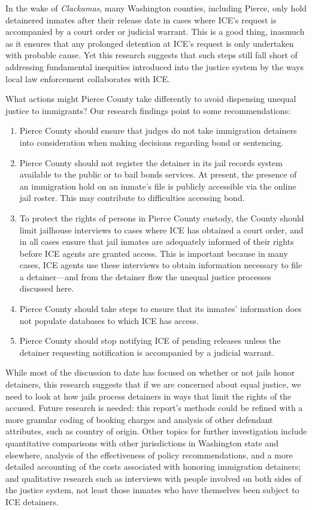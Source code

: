 \documentclass[12pt]{report}\usepackage[]{graphicx}\usepackage[]{color}
\begin{document}
In the wake of \emph{Clackamas}, many Washington counties, including Pierce, only hold detainered inmates after their release date in cases where ICE's request is accompanied by a court order or judicial warrant. This is a good thing, inasmuch as it ensures that any prolonged detention at ICE's request is only undertaken with probable cause. Yet this research suggests that such steps still fall short of addressing fundamental inequities introduced into the justice system by the ways local law enforcement collaborates with ICE.

What actions might Pierce County take differently to avoid dispensing unequal justice to immigrants? Our research findings point to some recommendations:

\begin{enumerate}
  \item Pierce County should ensure that judges do not take immigration detainers into consideration when making decisions regarding bond or sentencing.
  \item Pierce County should not register the detainer in its jail records system available to the public or to bail bonds services. At present, the presence of an immigration hold on an inmate's file is publicly accessible via the online jail roster. This may contribute to difficulties accessing bond.
  \item To protect the rights of persons in Pierce County custody, the County should limit jailhouse interviews to cases where ICE has obtained a court order, and in all cases ensure that jail inmates are adequately informed of their rights before ICE agents are granted access. This is important because in many cases, ICE agents use these interviews to obtain information necessary to file a detainer---and from the detainer flow the unequal justice processes discussed here.
  \item Pierce County should take steps to ensure that its inmates' information does not populate databases to which ICE has access.
  \item Pierce County should stop notifying ICE of pending releases unless the detainer requesting notification is accompanied by a judicial warrant. 
\end{enumerate}

While most of the discussion to date has focused on whether or not jails honor detainers, this research suggests that if we are concerned about equal justice, we need to look at how jails process detainers in ways that limit the rights of the accused. Future research is needed: this report's methods could be refined with a more granular coding of booking charges and analysis of other defendant attributes, such as country of origin. Other topics for further investigation include quantitative comparisons with other jurisdictions in Washington state and elsewhere, analysis of the effectiveness of policy recommendations, and a more detailed accounting of the costs associated with honoring immigration detainers; and qualitative research such as interviews with people involved on both sides of the justice system, not least those inmates who have themselves been subject to ICE detainers.
\end{document}
